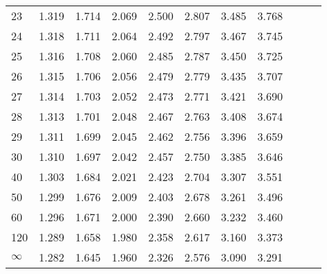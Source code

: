 \begin{frame}
{\begin{tabular}{l|llllllllll}
23 & 1.319 & 1.714 & 2.069 & 2.500 & 2.807 & 3.485 & 3.768 \\ 
24 & 1.318 & 1.711 & 2.064 & 2.492 & 2.797 & 3.467 & 3.745 \\ 
25 & 1.316 & 1.708 & 2.060 & 2.485 & 2.787 & 3.450 & 3.725 \\ 
[5pt]
26 & 1.315 & 1.706 & 2.056 & 2.479 & 2.779 & 3.435 & 3.707 \\ 
27 & 1.314 & 1.703 & 2.052 & 2.473 & 2.771 & 3.421 & 3.690 \\ 
28 & 1.313 & 1.701 & 2.048 & 2.467 & 2.763 & 3.408 & 3.674 \\ 
29 & 1.311 & 1.699 & 2.045 & 2.462 & 2.756 & 3.396 & 3.659 \\ 
30 & 1.310 & 1.697 & 2.042 & 2.457 & 2.750 & 3.385 & 3.646 \\ 
[5pt]
40 & 1.303 & 1.684 & 2.021 & 2.423 & 2.704 & 3.307 & 3.551 \\ 
50 & 1.299 & 1.676 & 2.009 & 2.403 & 2.678 & 3.261 & 3.496 \\ 
60 & 1.296 & 1.671 & 2.000 & 2.390 & 2.660 & 3.232 & 3.460 \\ 
120 & 1.289 & 1.658 & 1.980 & 2.358 & 2.617 & 3.160 & 3.373 \\ 
$\infty$ & 1.282 & 1.645 & 1.960 & 2.326 & 2.576 & 3.090 & 3.291 
\end{tabular}


}
\end{frame}


